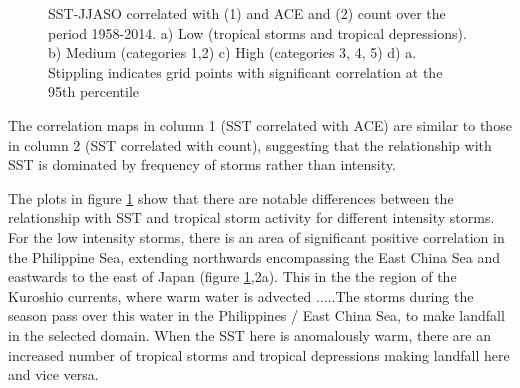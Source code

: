 \begin{figure}
	\centering
	
	\caption{SST-JJASO correlated with (1) and ACE and (2) count over the period 1958-2014. a) Low (tropical storms and tropical depressions). b) Medium (categories 1,2) c) High (categories 3, 4, 5) d) a. Stippling indicates grid points with significant correlation at the 95th percentile} \label{fig:corr_JJASO} 
\end{figure} 

The correlation maps in column 1 (SST correlated with ACE) are similar to those in column 2 (SST correlated with count), suggesting that the relationship with SST is dominated by frequency of storms rather than intensity.

The plots in figure \ref{fig:corr_JJASO} show that there are notable differences between the relationship with SST and tropical storm activity for different intensity storms. For the low intensity storms, there is an area of significant positive correlation in the Philippine Sea, extending northwards encompassing the East China Sea and eastwards to the east of Japan (figure \ref{fig:corr_JJASO},2a). This in the the region of the Kuroshio currents, where warm water is advected .....The storms during the season pass over this water in the Philippines / East China Sea, to make landfall in the selected domain. When the SST here is anomalously warm, there are an increased number of tropical storms and tropical depressions making landfall here and vice versa.

